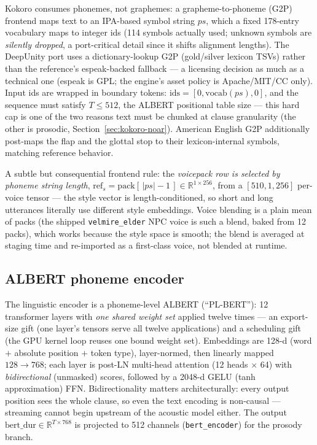 \documentclass[11pt,a4paper]{article}
\newcommand{\R}{\mathbb{R}}
\newcommand{\code}[1]{\texttt{#1}}
\begin{document}
Kokoro consumes phonemes, not graphemes: a grapheme-to-phoneme (G2P) frontend maps text
to an IPA-based symbol string $ps$, which a fixed 178-entry vocabulary maps to integer
ids (114 symbols actually used; unknown symbols are \emph{silently dropped}, a
port-critical detail since it shifts alignment lengths). The DeepUnity port uses a
dictionary-lookup G2P (gold/silver lexicon TSVs) rather than the reference's
espeak-backed fallback --- a licensing decision as much as a technical one (espeak is
GPL; the engine's asset policy is Apache/MIT/CC only). Input ids are wrapped in boundary
tokens: $\mathrm{ids} = [0, \mathrm{vocab}(ps), 0]$, and the sequence must satisfy
$T \le 512$, the ALBERT positional table size --- this hard cap is one of the two reasons
text must be chunked at clause granularity (the other is prosodic,
Section~\ref{sec:kokoro-noar}). American English G2P additionally post-maps the flap
and the glottal stop to their lexicon-internal symbols, matching reference behavior.

A subtle but consequential frontend rule: the \emph{voicepack row is selected by phoneme
string length}, $\mathrm{ref}_s = \mathrm{pack}[\,|ps|-1\,] \in \R^{1\times 256}$, from a
$[510,1,256]$ per-voice tensor --- the style vector is length-conditioned, so short and
long utterances literally use different style embeddings. Voice blending is a plain mean
of packs (the shipped \code{velmire\_elder} NPC voice is such a blend, baked from 12
packs), which works because the style space is smooth; the blend is averaged at staging
time and re-imported as a first-class voice, not blended at runtime.

\subsection{ALBERT phoneme encoder}
\label{sec:kokoro-albert}

The linguistic encoder is a phoneme-level ALBERT (``PL-BERT''): 12 transformer layers
with \emph{one shared weight set} applied twelve times --- an export-size gift (one
layer's tensors serve all twelve applications) and a scheduling gift (the GPU kernel loop
reuses one bound weight set). Embeddings are 128-d (word $+$ absolute position $+$ token
type), layer-normed, then linearly mapped $128 \to 768$; each layer is post-LN
multi-head attention (12 heads $\times$ 64) with \emph{bidirectional} (unmasked) scores,
followed by a 2048-d GELU (tanh approximation) FFN. Bidirectionality matters
architecturally: every output position sees the whole clause, so even the text encoding
is non-causal --- streaming cannot begin upstream of the acoustic model either. The
output $\mathrm{bert\_dur} \in \R^{T\times 768}$ is projected to 512 channels
(\code{bert\_encoder}) for the prosody branch.
\end{document}
